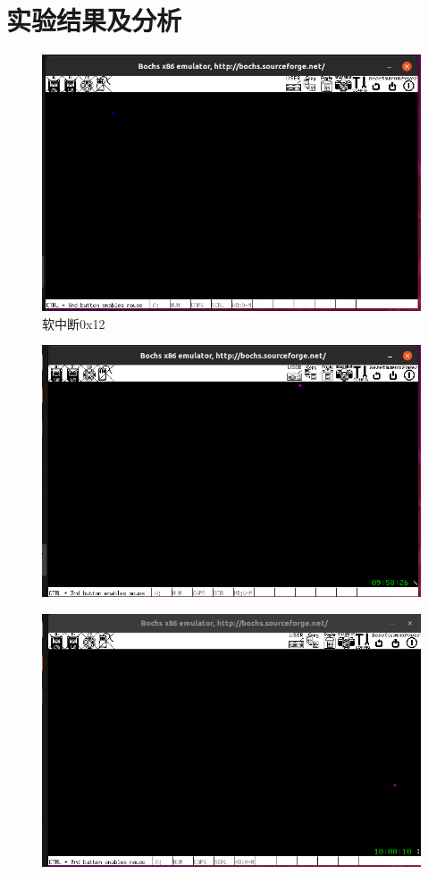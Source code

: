 \documentclass[a4paper,11pt,UTF8]{ctexart}
\newcommand{\bottomcaption}{%
\setlength{\abovecaptionskip}{6pt}%
\setlength{\belowcaptionskip}{6pt}%
\caption}
\begin{document}
\section{实验结果及分析}
	\begin{figure}[htbp]
		\centering
		\includegraphics[width=15cm]{expr_image/1.png}
		\bottomcaption{软中断0x12}
	\end{figure}
	\begin{figure}[htbp]
		\centering
		\includegraphics[width=15cm]{expr_image/2.png}
		\bottomcaption{}
	\end{figure}
	\begin{figure}[htbp]
		\centering
		\includegraphics[width=15cm]{expr_image/3.png}
		\bottomcaption{}
	\end{figure}
	
\end{document}
